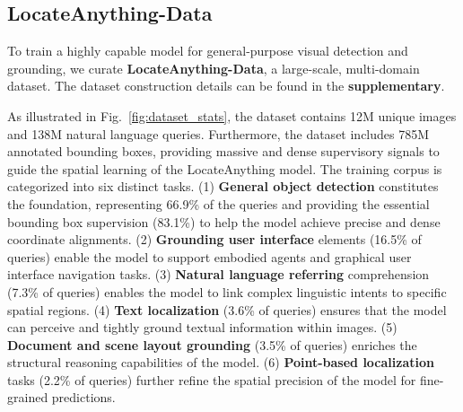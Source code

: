 \documentclass{llmxive}
\begin{document}
\subsection{LocateAnything-Data}
\label{sec:dataset}

To train a highly capable model for general-purpose visual detection and grounding, we curate \textbf{LocateAnything-Data}, a large-scale, multi-domain dataset. The dataset construction details can be found in the \textbf{supplementary}. 

As illustrated in Fig.~\ref{fig:dataset_stats}, the dataset contains 12M unique images and 138M natural language queries. Furthermore, the dataset includes 785M annotated bounding boxes, providing massive and dense supervisory signals to guide the spatial learning of the LocateAnything model. The training corpus is categorized into six distinct tasks. (1) \textbf{General object detection} constitutes the foundation, representing 66.9\% of the queries and providing the essential bounding box supervision (83.1\%) to help the model achieve precise and dense coordinate alignments. (2) \textbf{Grounding user interface} elements (16.5\% of queries) enable the model to support embodied agents and graphical user interface navigation tasks. (3) \textbf{Natural language referring} comprehension (7.3\% of queries) enables the model to link complex linguistic intents to specific spatial regions. (4) \textbf{Text localization} (3.6\% of queries) ensures that the model can perceive and tightly ground textual information within images. (5) \textbf{Document and scene layout grounding} (3.5\% of queries) enriches the structural reasoning capabilities of the model. (6) \textbf{Point-based localization} tasks (2.2\% of queries) further refine the spatial precision of the model for fine-grained predictions.

\end{document}
